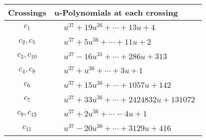 \documentclass[1p]{elsarticle_modified}
\theoremstyle{definition}
\begin{document}
\begin{tabular}{m{50pt}|m{274pt}}
Crossings & \hspace{64pt}u-Polynomials at each crossing \\
\hline $$\begin{aligned}c_{1}\end{aligned}$$&$\begin{aligned}
&u^{37}+19 u^{36}+\cdots+13 u+4
\end{aligned}$\\
\hline $$\begin{aligned}c_{2},c_{5}\end{aligned}$$&$\begin{aligned}
&u^{37}+5 u^{36}+\cdots+11 u+2
\end{aligned}$\\
\hline $$\begin{aligned}c_{3},c_{10}\end{aligned}$$&$\begin{aligned}
&u^{37}-16 u^{35}+\cdots+286 u+313
\end{aligned}$\\
\hline $$\begin{aligned}c_{4},c_{8}\end{aligned}$$&$\begin{aligned}
&u^{37}+u^{36}+\cdots+3 u+1
\end{aligned}$\\
\hline $$\begin{aligned}c_{6}\end{aligned}$$&$\begin{aligned}
&u^{37}+15 u^{36}+\cdots+1057 u+142
\end{aligned}$\\
\hline $$\begin{aligned}c_{7}\end{aligned}$$&$\begin{aligned}
&u^{37}+33 u^{36}+\cdots+2424832 u+131072
\end{aligned}$\\
\hline $$\begin{aligned}c_{9},c_{12}\end{aligned}$$&$\begin{aligned}
&u^{37}+2 u^{36}+\cdots-4 u+1
\end{aligned}$\\
\hline $$\begin{aligned}c_{11}\end{aligned}$$&$\begin{aligned}
&u^{37}-20 u^{36}+\cdots+3129 u+416
\end{aligned}$\\
\hline
\end{tabular}\\~\\
\end{document}
